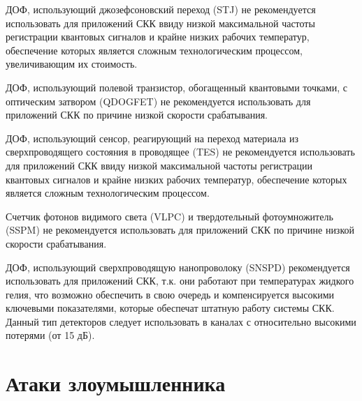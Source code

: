 ДОФ, использующий джозефсоновский переход (STJ) не рекомендуется использовать для приложений СКК ввиду низкой максимальной частоты регистрации квантовых сигналов и крайне низких рабочих температур, обеспечение которых является сложным технологическим процессом, увеличивающим их стоимость.


ДОФ, использующий полевой транзистор, обогащенный квантовыми точками, с оптическим затвором (QDOGFET) не рекомендуется использовать для приложений СКК по причине низкой скорости срабатывания.


ДОФ, использующий сенсор, реагирующий на переход материала из сверхпроводящего состояния в проводящее (TES) не рекомендуется использовать для приложений СКК ввиду низкой максимальной частоты регистрации квантовых сигналов и крайне низких рабочих температур, обеспечение которых является сложным технологическим процессом.


Счетчик фотонов видимого света (VLPC) и твердотельный фотоумножитель (SSPM) не рекомендуется использовать для приложений СКК по причине низкой скорости срабатывания.


ДОФ, использующий сверхпроводящую нанопроволоку (SNSPD) рекомендуется использовать для приложений СКК, т.\:к. они работают при температурах жидкого гелия, что возможно обеспечить в свою очередь и компенсируется высокими ключевыми показателями, которые обеспечат штатную работу системы СКК. Данный тип детекторов следует использовать в каналах с относительно высокими потерями (от 15 дБ). 


\section{Атаки злоумышленника} \label{sec:ch1/sec6} 

